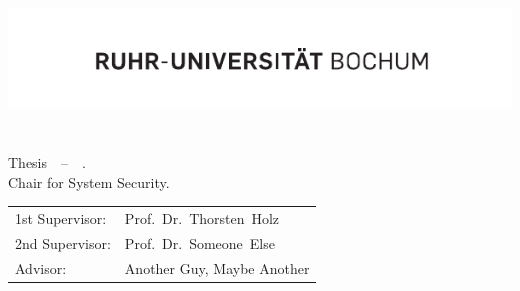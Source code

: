 \begin{titlepage}
\makeatletter

\enlargethispage{3cm}

 
\vspace*{10cm}
\begin{minipage}[b]{1\linewidth}
	\sffamily
  	\hspace{-17.2mm}\includegraphics[scale=1.0]{data/logo/rub_slogan}\\

   	\textbf{\LARGE {\@title}}\\
  
  	\Large{\@author}\\
		
  	\vspace{3cm}
  	\normalsize{
   	  \thtype\/ Thesis\@~~--~~\@date\@.\\
			Chair for System Security.\\
		}
		\newline
	  \normalsize{
	    \begin{tabular}{@{}ll@{}}
				1st Supervisor: & Prof.~Dr.~Thorsten~Holz\\
				2nd Supervisor: & Prof.~Dr.~Someone~Else\\
				Advisor: & Another Guy, Maybe Another\\
	      \end{tabular}
	  }
\end{minipage}

\makeatother
\end{titlepage}

